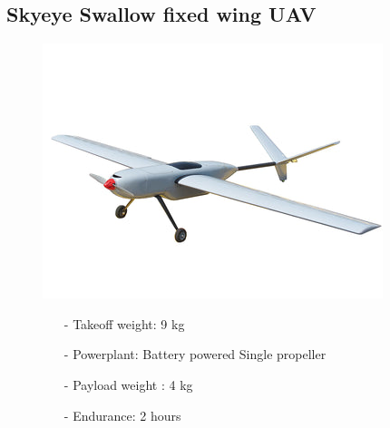 \documentclass{article}
\begin{document}
\subsection{Skyeye Swallow fixed wing UAV}
\begin{figure}[h]
    \begin{minipage}[b]{.45\linewidth}
        \centering
        \includegraphics[width=0.7\linewidth]{Aircraft pics/SKYEYE SWALLOW.png}
    \end{minipage}\hfill
    \begin{minipage}[b]{0.45\linewidth}
        \begin{itemize}
            \item [-] Takeoff weight: 9 kg
            \item [-] Powerplant: Battery powered Single propeller
            \item [-] Payload weight : 4 kg
            \item [-] Endurance: 2 hours
        \end{itemize}
    \end{minipage}
\end{figure}

\vspace{\fill}
\end{document}
